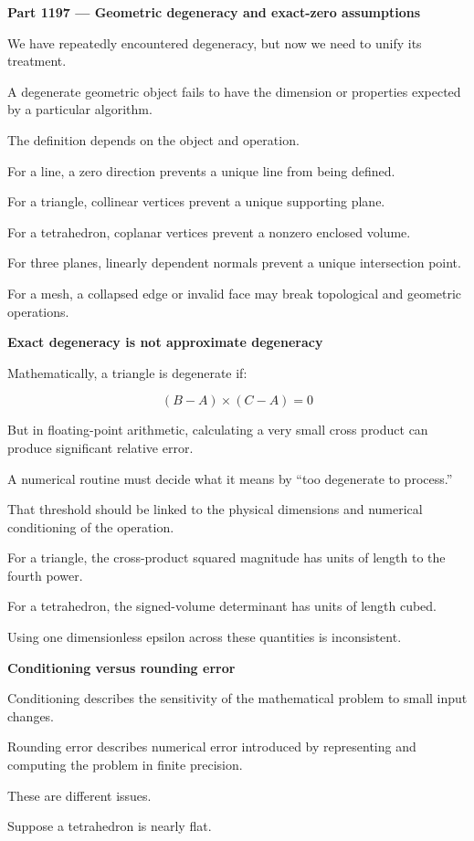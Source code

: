 \textbf{Part 1197 --- Geometric degeneracy and exact-zero assumptions}

We have repeatedly encountered degeneracy, but now we need to unify its treatment.

A degenerate geometric object fails to have the dimension or properties expected by a particular algorithm.

The definition depends on the object and operation.

For a line, a zero direction prevents a unique line from being defined.

For a triangle, collinear vertices prevent a unique supporting plane.

For a tetrahedron, coplanar vertices prevent a nonzero enclosed volume.

For three planes, linearly dependent normals prevent a unique intersection point.

For a mesh, a collapsed edge or invalid face may break topological and geometric operations.

\textbf{Exact degeneracy is not approximate degeneracy}

Mathematically, a triangle is degenerate if:

\[
(B-A)\times(C-A)=0
\]

But in floating-point arithmetic, calculating a very small cross product can produce significant relative error.

A numerical routine must decide what it means by ``too degenerate to process.''

That threshold should be linked to the physical dimensions and numerical conditioning of the operation.

For a triangle, the cross-product squared magnitude has units of length to the fourth power.

For a tetrahedron, the signed-volume determinant has units of length cubed.

Using one dimensionless epsilon across these quantities is inconsistent.

\textbf{Conditioning versus rounding error}

Conditioning describes the sensitivity of the mathematical problem to small input changes.

Rounding error describes numerical error introduced by representing and computing the problem in finite precision.

These are different issues.

Suppose a tetrahedron is nearly flat.

